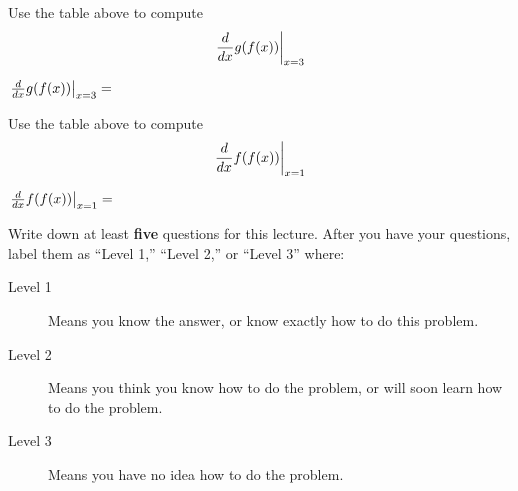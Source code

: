 \documentclass{ximera}
\begin{document}
\begin{question}
Use the table above to compute
\[
\left.\frac{d}{dx} g(f(x))\right|_{x=3}
\]
\begin{prompt}
$\left.\frac{d}{dx} g(f(x))\right|_{x=3}=$
\end{prompt}
\end{question}


\begin{question}
Use the table above to compute
\[
\left.\frac{d}{dx} f(f(x))\right|_{x=1}
\]
\begin{prompt}
$\left.\frac{d}{dx} f(f(x))\right|_{x=1}=$
\end{prompt}
\end{question}




\begin{question}
Write down at least \textbf{five} questions for this lecture. After
you have your questions, label them as ``Level 1,'' ``Level 2,'' or ``Level 3'' where:
\begin{description}
\item[Level 1] Means you know the answer, or know exactly how to do this problem.
\item[Level 2] Means you think you know how to do the problem, or will soon learn how to do the problem.
\item[Level 3] Means you have no idea how to do the problem. 
\end{description}
  \begin{freeResponse}
  \end{freeResponse}
\end{question}
\end{document}
